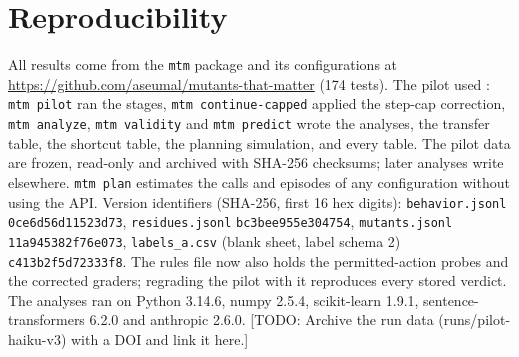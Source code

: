\documentclass[10pt]{article}
\theoremstyle{definition}
\newcommand{\todo}[1]{\textcolor{BrickRed}{[TODO: #1]}}
\begin{document}
\section{Reproducibility}
{\sloppy
All results come from the \texttt{mtm} package and its configurations at \url{https://github.com/aseumal/mutants-that-matter} (174 tests). The pilot used : \texttt{mtm pilot} ran the stages, \texttt{mtm continue-capped} applied the step-cap correction, \texttt{mtm analyze}, \texttt{mtm validity} and \texttt{mtm predict} wrote the analyses,  the transfer table,  the shortcut table,  the planning simulation, and  every table. The pilot data are frozen, read-only and archived with SHA-256 checksums; later analyses write elsewhere. \texttt{mtm plan} estimates the calls and episodes of any configuration without using the API. Version identifiers (SHA-256, first 16 hex digits): \texttt{behavior.jsonl} \texttt{0ce6d56d11523d73}, \texttt{residues.jsonl} \texttt{bc3bee955e304754}, \texttt{mutants.jsonl} \texttt{11a945382f76e073}, \texttt{labels\_a.csv} (blank sheet, label schema 2) \texttt{c413b2f5d72333f8}. The rules file now also holds the permitted-action probes and the corrected graders; regrading the pilot with it reproduces every stored verdict. The analyses ran on Python 3.14.6, numpy 2.5.4, scikit-learn 1.9.1, sentence-transformers 6.2.0 and anthropic 2.6.0.
\todo{Archive the run data (runs/pilot-haiku-v3) with a DOI and link it here.}
}
\end{document}

